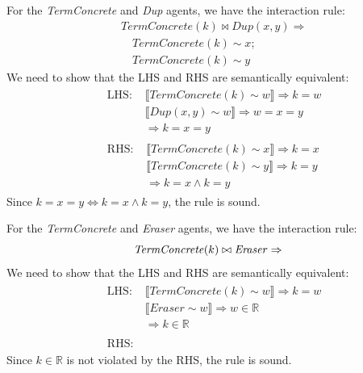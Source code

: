 \begin{lemma}
	For the \textit{TermConcrete} and \textit{Dup} agents, we have the interaction rule:
	$$
	\begin{aligned}
		& \mathit{TermConcrete}(k) \bowtie \mathit{Dup}(x, y) \Rightarrow \\
		& \quad \mathit{TermConcrete}(k) \sim x; \\
		& \quad \mathit{TermConcrete}(k) \sim y
	\end{aligned}
	$$
	We need to show that the LHS and RHS are semantically equivalent:
	$$
	\begin{aligned}
		& \begin{aligned}
			\text{LHS: } & \llbracket \mathit{TermConcrete}(k) \sim w \rrbracket \Rightarrow k = w \\
			& \llbracket \mathit{Dup}(x, y) \sim w \rrbracket \Rightarrow w = x = y \\
			& \Rightarrow k = x = y
		\end{aligned} \\
		& \begin{aligned}
			\text{RHS: } & \llbracket \mathit{TermConcrete}(k) \sim x \rrbracket \Rightarrow k = x \\
			& \llbracket \mathit{TermConcrete}(k) \sim y \rrbracket \Rightarrow k = y \\
			& \Rightarrow k = x \land k = y
		\end{aligned}
	\end{aligned}
	$$
	Since $k = x = y \iff k = x \land k = y$, the rule is sound.
\end{lemma}

\begin{lemma}
	For the \textit{TermConcrete} and \textit{Eraser} agents, we have the interaction rule:
	$$
	\mathit{TermConcrete}(k) \bowtie \mathit{Eraser} \Rightarrow  \\
	$$
	We need to show that the LHS and RHS are semantically equivalent:
	$$
	\begin{aligned}
		& \begin{aligned}
			\text{LHS: } & \llbracket \mathit{TermConcrete}(k) \sim w \rrbracket \Rightarrow k = w \\
			& \llbracket \mathit{Eraser} \sim w \rrbracket \Rightarrow w \in \mathbb{R} \\
			& \Rightarrow k \in \mathbb{R} 
		\end{aligned} \\
		& \begin{aligned}
			\text{RHS: }
		\end{aligned}
	\end{aligned}
	$$
	Since $k \in \mathbb{R}$ is not violated by the RHS, the rule is sound.
\end{lemma}


